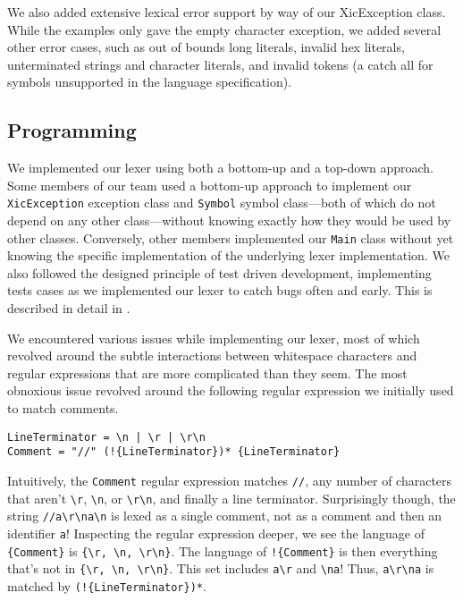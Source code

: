 \documentclass{hw}
\begin{document}

We also added extensive lexical error support by way of our XicException class. While
the examples only gave the empty character exception, we added several other error cases,
such as out of bounds long literals, invalid hex literals, unterminated strings and
character literals, and invalid tokens (a catch all for symbols unsupported in the
language specification).

\subsection{Programming}
We implemented our lexer using both a bottom-up and a top-down approach. Some
members of our team used a bottom-up approach to implement our
\texttt{XicException} exception class and \texttt{Symbol} symbol class---both
of which do not depend on any other class---without knowing exactly how they
would be used by other classes. Conversely, other members implemented our
\texttt{Main} class without yet knowing the specific implementation of the
underlying lexer implementation. We also followed the designed principle of
test driven development, implementing tests cases as we implemented our lexer
to catch bugs often and early. This is described in detail in .

We encountered various issues while implementing our lexer, most of which
revolved around the subtle interactions between whitespace characters and
regular expressions that are more complicated than they seem. The most
obnoxious issue revolved around the following regular expression we initially
used to match comments.

\begin{center}
\begin{BVerbatim}
LineTerminator = \n | \r | \r\n
Comment = "//" (!{LineTerminator})* {LineTerminator}
\end{BVerbatim}
\end{center}

Intuitively, the \texttt{Comment} regular expression matches \texttt{//}, any
number of characters that aren't \verb$\r$, \verb$\n$, or \verb$\r\n$, and
finally a line terminator. Surprisingly though, the string \verb$//a\r\na\n$ is
lexed as a single comment, not as a comment and then an identifier \verb$a$!
Inspecting the regular expression deeper, we see the language of
\verb${Comment}$ is \verb${\r, \n, \r\n}$. The language of \verb$!{Comment}$ is
then everything that's not in \verb${\r, \n, \r\n}$. This set includes
\verb$a\r$ and \verb$\na$! Thus, \verb$a\r\na$ is matched by
\verb$(!{LineTerminator})*$.
\end{document}
